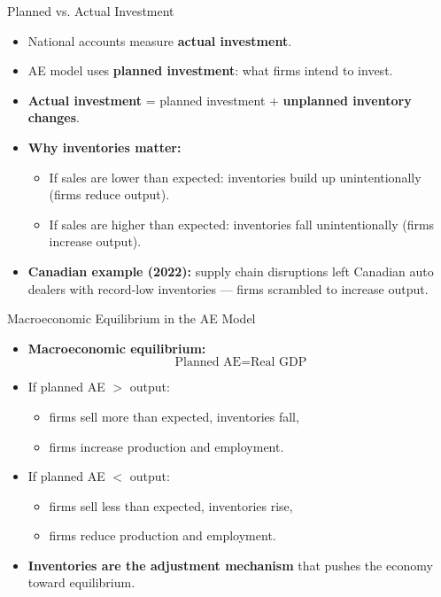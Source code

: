 \documentclass[aspectratio=169]{beamer}
\begin{document}
\begin{frame}{Planned vs. Actual Investment}
\transfade
\begin{itemize}
  \item National accounts measure \textbf{actual investment}.
  \item AE model uses \textbf{planned investment}: what firms intend to invest.
  \item \textbf{Actual investment} = planned investment + \textbf{unplanned inventory changes}.
  \item \textbf{Why inventories matter:}
  \begin{itemize}
    \item If sales are \alert{lower than expected}: inventories build up unintentionally (firms reduce output).
    \item If sales are \alert{higher than expected}: inventories fall unintentionally (firms increase output).
  \end{itemize}
  \item \textbf{Canadian example (2022):} supply chain disruptions left Canadian auto dealers with record-low inventories --- firms scrambled to increase output.
\end{itemize}
\end{frame}

\begin{frame}{Macroeconomic Equilibrium in the AE Model}
\transfade
\begin{itemize}
  \item \textbf{Macroeconomic equilibrium:}
  \[
    \text{Planned AE} = \text{Real GDP}
  \]
  \item If planned AE $>$ output:
  \begin{itemize}
    \item firms sell more than expected, inventories fall,
    \item firms \alert{increase} production and employment.
  \end{itemize}
  \item If planned AE $<$ output:
  \begin{itemize}
    \item firms sell less than expected, inventories rise,
    \item firms \alert{reduce} production and employment.
  \end{itemize}
  \item \textbf{Inventories are the adjustment mechanism} that pushes the economy toward equilibrium.
\end{itemize}
\end{frame}
\end{document}
